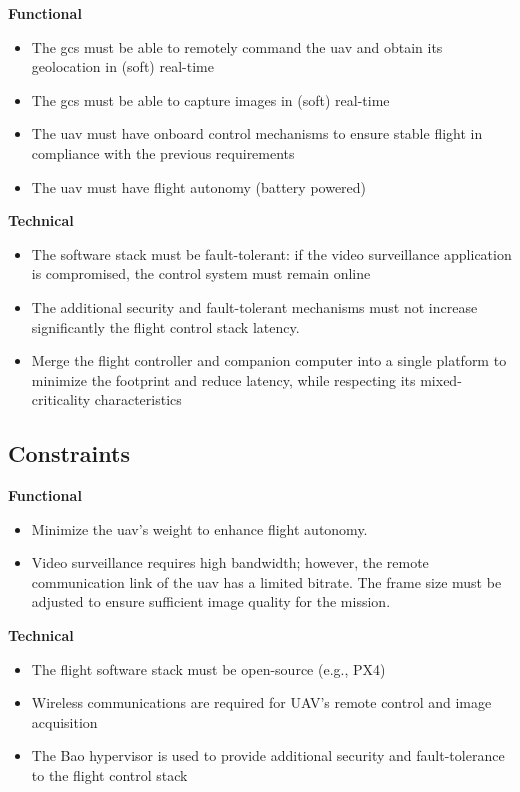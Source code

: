 \textbf{Functional}
  \begin{itemize}
    \item The \gls{gcs} must be able to remotely command the \gls{uav} and
obtain its geolocation in (soft) real-time 
    \item The \gls{gcs} must be able to capture images in (soft) real-time
    \item The \gls{uav} must have onboard control mechanisms to ensure stable
flight in compliance with the previous requirements
    \item The \gls{uav} must have flight autonomy (battery powered) 
    \end{itemize}


\textbf{Technical}
  \begin{itemize}
    \item The software stack must be fault-tolerant: if the video surveillance
application is compromised, the control system must remain online 
    \item The additional security and fault-tolerant mechanisms must not
increase significantly the flight control stack latency.
\item Merge the flight controller and companion computer into a single platform
to minimize the footprint and reduce latency, while respecting its
mixed-criticality characteristics
    \end{itemize}

\subsection{Constraints}
\label{sec:constr}

\textbf{Functional}
\begin{itemize}
    \item Minimize the \gls{uav}'s weight to enhance flight autonomy.
    \item Video surveillance requires high bandwidth; however, the remote
communication link of the \gls{uav} has a limited bitrate. The frame size must
be adjusted to ensure sufficient image quality for the mission. 
\end{itemize}


\textbf{Technical}
  \begin{itemize}
    \item The flight software stack must be open-source (e.g., PX4)
    \item Wireless communications are required for UAV's remote control and
image acquisition
\item The Bao hypervisor is used to provide additional security and
fault-tolerance to the flight control stack
    \end{itemize}

